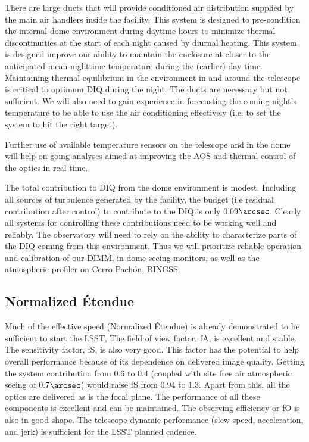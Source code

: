 There are large ducts that will provide conditioned air distribution supplied by the main air handlers inside the facility. This system is designed to pre-condition the internal dome environment during daytime hours to minimize thermal discontinuities at the start of each night caused by diurnal heating.  This system is designed improve our ability to maintain the enclosure at closer to the anticipated mean nighttime temperature during the (earlier) day time. Maintaining thermal equilibrium in the environment in and around the telescope is critical to optimum DIQ during the night. The ducts are necessary but not sufficient. We will also need to gain experience in forecasting the coming night's temperature to be able to use the air conditioning effectively (i.e. to set the system to hit the right target). 

Further use of available temperature sensors on the telescope and in the dome will help on going analyses aimed at improving the AOS and thermal control of the optics in real time. 

The total contribution to DIQ from the dome environment is modest. Including all sources of turbulence generated by the facility, the budget (i.e residual contribution after control) to contribute to the DIQ is only 0.09$\arcsec$. Clearly all systems for controlling these contributions need to be working well and reliably. The observatory will need to rely on the ability to characterize parts of the DIQ coming from this environment. Thus we will prioritize reliable operation and calibration of our DIMM, in-dome seeing monitors, as well as the atmospheric profiler on Cerro Pach\'{o}n, RINGSS.  

\subsection{Normalized \'{E}tendue}
Much of the effective speed (Normalized  \'{E}tendue) is already demonstrated to be sufficient to start the LSST, The field of view factor, fA, is excellent and stable. The sensitivity factor, fS, is also very good. This factor has the potential to help overall performance because of its dependence on delivered image quality. Getting the system contribution from 0.6 to 0.4 (coupled with site free air atmospheric seeing of 0.7$\arcsec$) would raise fS from 0.94 to 1.3. Apart from this, all the optics are delivered as is the focal plane. The performance of all these components is excellent and can be maintained. The observing efficiency or fO is also in good shape. The telescope dynamic performance (slew speed, acceleration, and jerk) is sufficient for the LSST planned cadence. 

